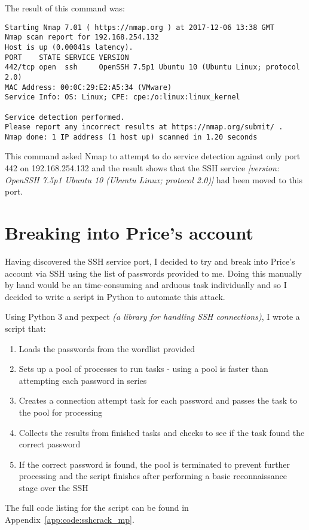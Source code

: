 \documentclass[12pt]{report}
\begin{document}
The result of this command was:
\begin{Verbatim}[frame=leftline]
Starting Nmap 7.01 ( https://nmap.org ) at 2017-12-06 13:38 GMT
Nmap scan report for 192.168.254.132
Host is up (0.00041s latency).
PORT    STATE SERVICE VERSION
442/tcp open  ssh     OpenSSH 7.5p1 Ubuntu 10 (Ubuntu Linux; protocol 2.0)
MAC Address: 00:0C:29:E2:A5:34 (VMware)
Service Info: OS: Linux; CPE: cpe:/o:linux:linux_kernel

Service detection performed.
Please report any incorrect results at https://nmap.org/submit/ .
Nmap done: 1 IP address (1 host up) scanned in 1.20 seconds
\end{Verbatim}

This command asked Nmap to attempt to do service detection against only port 442 on 192.168.254.132 and the result shows that the SSH service \textit{[version: OpenSSH 7.5p1 Ubuntu 10 (Ubuntu Linux; protocol 2.0)]} had been moved to this port.


\section{Breaking into Price's account}
Having discovered the SSH service port, I decided to try and break into Price's account via SSH using the list of passwords provided to me. Doing this manually by hand would be an time-consuming and arduous task individually and so I decided to write a script in Python to automate this attack.

Using Python 3 and pexpect \textit{(a library for handling SSH connections)}, I wrote a script that:
\begin{enumerate}
  \item Loads the passwords from the wordlist provided
  \item Sets up a pool of processes to run tasks - using a pool is faster than attempting each password in series
  \item Creates a connection attempt task for each password and passes the task to the pool for processing
  \item Collects the results from finished tasks and checks to see if the task found the correct password
  \item If the correct password is found, the pool is terminated to prevent further processing and the script finishes after performing a basic reconnaissance stage over the SSH
\end{enumerate}

The full code listing for the script can be found in Appendix~\ref{app:code:sshcrack_mp}.
\end{document}
